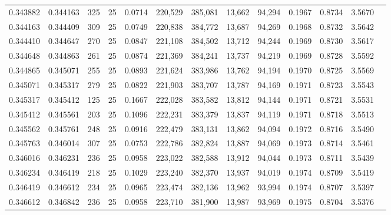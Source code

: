 \begin{tabular}{rrrrrrrrrrrrr}
0.343882 & 0.344163 &   325 &  25 &                                     0.0714 & 220,529 & 385,081 &  13,662 &  94,294 & 0.1967 & 0.8734 & 3.5670 \\
0.344163 & 0.344409 &   309 &  25 &                                     0.0749 & 220,838 & 384,772 &  13,687 &  94,269 & 0.1968 & 0.8732 & 3.5642 \\
0.344410 & 0.344647 &   270 &  25 &                                     0.0847 & 221,108 & 384,502 &  13,712 &  94,244 & 0.1969 & 0.8730 & 3.5617 \\
0.344648 & 0.344863 &   261 &  25 &                                     0.0874 & 221,369 & 384,241 &  13,737 &  94,219 & 0.1969 & 0.8728 & 3.5592 \\
0.344865 & 0.345071 &   255 &  25 &                                     0.0893 & 221,624 & 383,986 &  13,762 &  94,194 & 0.1970 & 0.8725 & 3.5569 \\
0.345071 & 0.345317 &   279 &  25 &                                     0.0822 & 221,903 & 383,707 &  13,787 &  94,169 & 0.1971 & 0.8723 & 3.5543 \\
0.345317 & 0.345412 &   125 &  25 &                                     0.1667 & 222,028 & 383,582 &  13,812 &  94,144 & 0.1971 & 0.8721 & 3.5531 \\
0.345412 & 0.345561 &   203 &  25 &                                     0.1096 & 222,231 & 383,379 &  13,837 &  94,119 & 0.1971 & 0.8718 & 3.5513 \\
0.345562 & 0.345761 &   248 &  25 &                                     0.0916 & 222,479 & 383,131 &  13,862 &  94,094 & 0.1972 & 0.8716 & 3.5490 \\
0.345763 & 0.346014 &   307 &  25 &                                     0.0753 & 222,786 & 382,824 &  13,887 &  94,069 & 0.1973 & 0.8714 & 3.5461 \\
0.346016 & 0.346231 &   236 &  25 &                                     0.0958 & 223,022 & 382,588 &  13,912 &  94,044 & 0.1973 & 0.8711 & 3.5439 \\
0.346234 & 0.346419 &   218 &  25 &                                     0.1029 & 223,240 & 382,370 &  13,937 &  94,019 & 0.1974 & 0.8709 & 3.5419 \\
0.346419 & 0.346612 &   234 &  25 &                                     0.0965 & 223,474 & 382,136 &  13,962 &  93,994 & 0.1974 & 0.8707 & 3.5397 \\
0.346612 & 0.346842 &   236 &  25 &                                     0.0958 & 223,710 & 381,900 &  13,987 &  93,969 & 0.1975 & 0.8704 & 3.5376 \\

\end{tabular}
